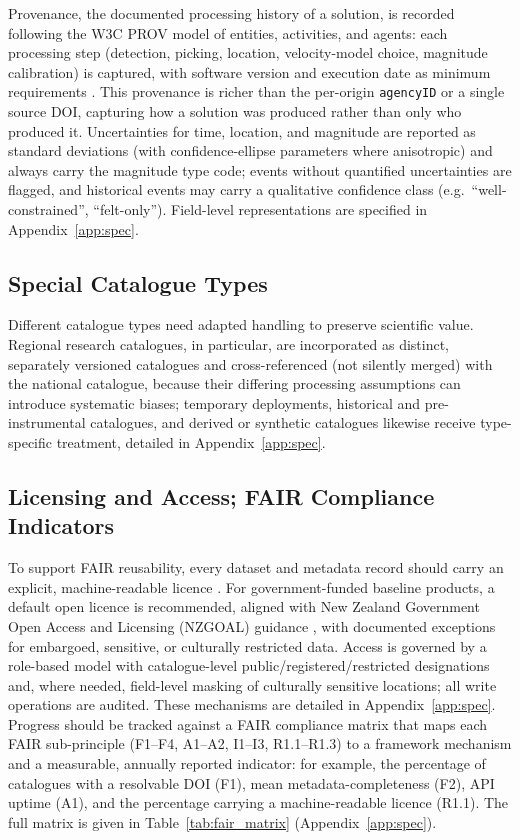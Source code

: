 \documentclass[11pt]{article}
\begin{document}
Provenance, the documented processing history of a solution, is recorded following the W3C PROV model of entities, activities, and agents: each processing step (detection, picking, location, velocity-model choice, magnitude calibration) is captured, with software version and execution date as minimum requirements \citep{PROVO}. This provenance is richer than the per-origin \texttt{agencyID} or a single source DOI, capturing how a solution was produced rather than only who produced it. Uncertainties for time, location, and magnitude are reported as standard deviations (with confidence-ellipse parameters where anisotropic) and always carry the magnitude type code; events without quantified uncertainties are flagged, and historical events may carry a qualitative confidence class (e.g.\ ``well-constrained'', ``felt-only''). Field-level representations are specified in Appendix~\ref{app:spec}.

\subsection{Special Catalogue Types}
Different catalogue types need adapted handling to preserve scientific value. Regional research catalogues, in particular, are incorporated as distinct, separately versioned catalogues and cross-referenced (not silently merged) with the national catalogue, because their differing processing assumptions can introduce systematic biases; temporary deployments, historical and pre-instrumental catalogues, and derived or synthetic catalogues likewise receive type-specific treatment, detailed in Appendix~\ref{app:spec}.

\subsection{Licensing and Access; FAIR Compliance Indicators}
To support FAIR reusability, every dataset and metadata record should carry an explicit, machine-readable licence \citep{FAIRPrinciples2016, GOFAIR}. For government-funded baseline products, a default open licence is recommended, aligned with New Zealand Government Open Access and Licensing (NZGOAL) guidance \citep{NZGOAL2022}, with documented exceptions for embargoed, sensitive, or culturally restricted data. Access is governed by a role-based model with catalogue-level public/registered/restricted designations and, where needed, field-level masking of culturally sensitive locations; all write operations are audited. These mechanisms are detailed in Appendix~\ref{app:spec}. Progress should be tracked against a FAIR compliance matrix that maps each FAIR sub-principle (F1--F4, A1--A2, I1--I3, R1.1--R1.3) to a framework mechanism and a measurable, annually reported indicator: for example, the percentage of catalogues with a resolvable DOI (F1), mean metadata-completeness (F2), API uptime (A1), and the percentage carrying a machine-readable licence (R1.1). The full matrix is given in Table~\ref{tab:fair_matrix} (Appendix~\ref{app:spec}).
\end{document}
